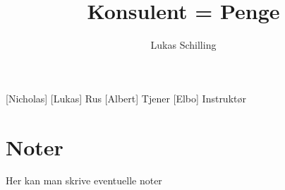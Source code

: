 \documentclass[a4paper,11pt]{article}
\title{Konsulent = Penge}
\author{Lukas Schilling}
\begin{document}
\maketitle

\begin{roles}
[Nicholas] 
[Lukas] Rus
[Albert] Tjener
[Elbo] Instruktør 
\end{roles} 

\section*{Noter}
Her kan man skrive eventuelle noter 

\begin{props}
\prop{}
\prop{}
\prop{}
\prop{}
\prop{}
\end{props}
\end{document}
